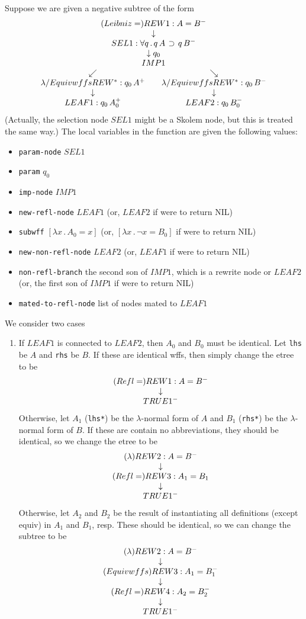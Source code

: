 \begin{enumerate}
Suppose we are given a negative subtree of the form
$$\erew{1}{Leibniz=}{A = B^-}{\sel{1}{\forall q \, .\, q\, A\, \limplies\, q\, B^-}
{q_0}{\eimp{1}{q_0\, A\, \limplies \, q_0\, B^-}
{\erewstar{\lambda/Equivwffs}{q_0\, A^+}{\eleaf{1}{q_0\, A_0^+}}}
{\erewstar{\lambda/Equivwffs}{q_0\, B^-}{\eleaf{2}{q_0\, B_0^-}}}}}$$
(Actually, the selection node $SEL1$ might be a Skolem node, but
this is treated the same way.)
The local variables in the function are given the following values:
\begin{itemize}
\item  \verb+param-node+ $SEL1$
\item  \verb+param+ $q_0$
\item  \verb+imp-node+ $IMP1$
\item  \verb+new-refl-node+ $LEAF1$ (or, $LEAF2$ if  were to return NIL)
\item  \verb+subwff+ $[\lambda x\, . \, A_0 = x]$ (or, $[\lambda x\, . \, \lnot x = B_0]$ if  were to return NIL)
\item \verb+new-non-refl-node+ $LEAF2$ (or, $LEAF1$ if  were to return NIL)
\item \verb+non-refl-branch+ the second son of $IMP1$, which is a rewrite node or $LEAF2$
(or, the first son of $IMP1$ if  were to return NIL)
\item \verb+mated-to-refl-node+  list of nodes mated to $LEAF1$
\end{itemize}
We consider two cases
\begin{enumerate}
\item  If $LEAF1$ is connected to $LEAF2$, then $A_0$ and $B_0$
must be identical.  Let \verb+lhs+ be $A$ and \verb+rhs+ be $B$.
If these are identical wffs, then simply change the etree to
be 
$$\erew{1}{Refl=}{A = B^-}{\truenode{1^-}}$$
Otherwise, let $A_1$ (\verb+lhs*+) be the $\lambda$-normal form of $A$
and $B_1$ (\verb+rhs*+) be the $\lambda$-normal form of $B$.
If these are contain no abbreviations, they should be identical, so
we change the etree to be
$$\erew{2}{\lambda}{A = B^-}{\erew{3}{Refl=}{A_1 = B_1}{\truenode{1^-}}}$$
Otherwise, let $A_2$ and $B_2$ be the result of instantiating all definitions (except equiv)
in $A_1$ and $B_1$, resp.  These should be identical, so we can change the subtree
to be
$$\erew{2}{\lambda}{A = B^-}{\erew{3}{Equivwffs}{A_1 = B_1^-}
{\erew{4}{Refl=}{A_2 = B_2^-}{\truenode{1^-}}}}$$


\end{enumerate}
\end{enumerate}
